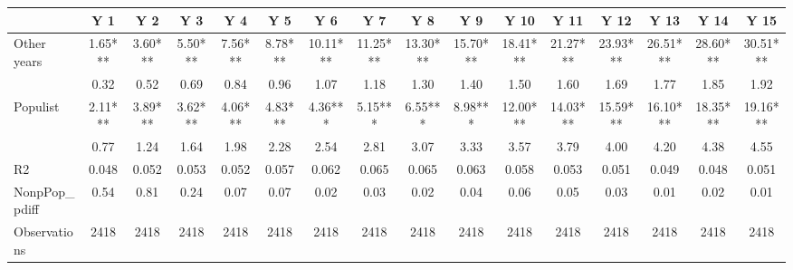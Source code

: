 {
\def\sym#1{\ifmmode^{#1}\else\(^{#1}\)\fi}
\begin{tabular}{l*{15}{c}}
\hline\hline
             &\multicolumn{1}{c}{Y 1}&\multicolumn{1}{c}{Y 2}&\multicolumn{1}{c}{Y 3}&\multicolumn{1}{c}{Y 4}&\multicolumn{1}{c}{Y 5}&\multicolumn{1}{c}{Y 6}&\multicolumn{1}{c}{Y 7}&\multicolumn{1}{c}{Y 8}&\multicolumn{1}{c}{Y 9}&\multicolumn{1}{c}{Y 10}&\multicolumn{1}{c}{Y 11}&\multicolumn{1}{c}{Y 12}&\multicolumn{1}{c}{Y 13}&\multicolumn{1}{c}{Y 14}&\multicolumn{1}{c}{Y 15}\\
\hline
\hline
Other years  &     1.65***&     3.60***&     5.50***&     7.56***&     8.78***&    10.11***&    11.25***&    13.30***&    15.70***&    18.41***&    21.27***&    23.93***&    26.51***&    28.60***&    30.51***\\
             &     0.32   &     0.52   &     0.69   &     0.84   &     0.96   &     1.07   &     1.18   &     1.30   &     1.40   &     1.50   &     1.60   &     1.69   &     1.77   &     1.85   &     1.92   \\
Populist     &     2.11***&     3.89***&     3.62***&     4.06***&     4.83***&     4.36***&     5.15***&     6.55***&     8.98***&    12.00***&    14.03***&    15.59***&    16.10***&    18.35***&    19.16***\\
             &     0.77   &     1.24   &     1.64   &     1.98   &     2.28   &     2.54   &     2.81   &     3.07   &     3.33   &     3.57   &     3.79   &     4.00   &     4.20   &     4.38   &     4.55   \\
R2           &    0.048   &    0.052   &    0.053   &    0.052   &    0.057   &    0.062   &    0.065   &    0.065   &    0.063   &    0.058   &    0.053   &    0.051   &    0.049   &    0.048   &    0.051   \\
NonpPop\_pdiff&     0.54   &     0.81   &     0.24   &     0.07   &     0.07   &     0.02   &     0.03   &     0.02   &     0.04   &     0.06   &     0.05   &     0.03   &     0.01   &     0.02   &     0.01   \\
Observations &     2418   &     2418   &     2418   &     2418   &     2418   &     2418   &     2418   &     2418   &     2418   &     2418   &     2418   &     2418   &     2418   &     2418   &     2418   \\
\hline\hline
\end{tabular}
}
